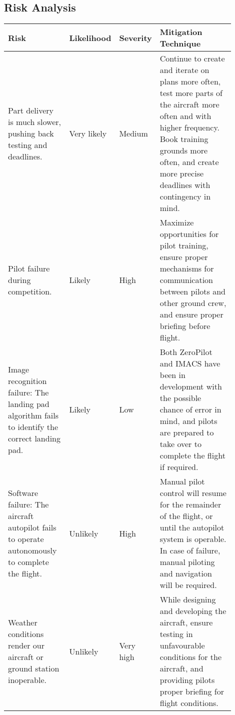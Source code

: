\subsection{Risk Analysis}
\label{sec:risk-analysis}

\begin{table}[htpb]
	\centering
	\begin{tabular}{p{0.28\linewidth}  p{0.14\linewidth}  p{0.12\linewidth}
		 p{0.36\linewidth} }

		\textbf{Risk} &
		\textbf{Likelihood} & \textbf{Severity} &
		\textbf{Mitigation Technique} \\ \midrule

		Part delivery is much slower, pushing back testing and deadlines. &
		Very likely & Medium & %
		Continue to create and iterate on plans more often, test more parts of
		the aircraft more often and with higher frequency. Book training
		grounds more often, and create more precise deadlines with contingency
		in mind. \\ \midrule

		Pilot failure during competition. &
		Likely & High & %
		Maximize opportunities for pilot training, ensure proper mechanisms for
		communication between pilots and other ground crew, and ensure proper
		briefing before flight. \\ \midrule

		Image recognition failure: The landing pad algorithm fails
		to identify the correct landing pad. & Likely & Low &
		Both ZeroPilot and IMACS have been in development with the possible
		chance of error in mind, and pilots are prepared to take over to
		complete the flight if required. \\ \midrule

		Software failure: The aircraft autopilot fails to operate autonomously
		to complete the flight. &
		Unlikely & High & %
		Manual pilot control will resume for the remainder of the flight, or
		until the autopilot system is operable. In case of failure, manual
		piloting and navigation will be required. \\ \midrule


	    Weather conditions render our aircraft or ground station inoperable. &
		Unlikely & Very high & %
		While designing and developing the aircraft, ensure testing in
		unfavourable conditions for the aircraft, and providing pilots proper
		briefing for flight conditions. \\ \midrule


\end{tabular}
\end{table}
